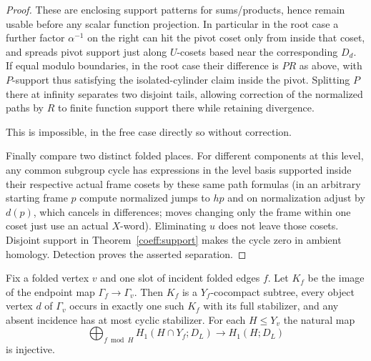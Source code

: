 \begin{proof}
These are enclosing support patterns for sums/products, hence remain usable before any scalar function projection. In particular in the root case a further factor \(\alpha^{-1}\) on the right can hit the pivot coset only from inside that coset, and spreads pivot support just along \(U\)-cosets based near the corresponding \(D_d\). If equal modulo boundaries, in the root case their difference is \(P R\) as above, with \(P\)-support thus satisfying the isolated-cylinder claim inside the pivot. Splitting \(P\) there at infinity separates two disjoint tails, allowing correction of the normalized paths by \(R\) to finite function support there while retaining divergence.

This is impossible, in the free case directly so without correction.

Finally compare two distinct folded places.
For different components at this level, any common subgroup cycle has expressions in the level basis supported inside their respective actual frame cosets by these same path formulas (in an arbitrary starting frame \(p\) compute normalized jumps to \(h p\) and on normalization adjust by \(d(p)\), which cancels in differences; moves changing only the frame within one coset just use an actual \(X\)-word). Eliminating \(u\) does not leave those cosets. Disjoint support in Theorem~\ref{coeff:support} makes the cycle zero in ambient homology. Detection proves the asserted separation.
\end{proof}

\begin{proposition}\label{close:folded-slot}
Fix a folded vertex $v$ and one slot of incident folded edges $f$.
Let $K_f$ be the image of the endpoint map
$\Gamma_f\to\Gamma_v$. Then $K_f$ is a $Y_f$-cocompact subtree, every
object vertex $d$ of $\Gamma_v$ occurs in exactly one such $K_f$ with
its full stabilizer, and any absent incidence has at most cyclic
stabilizer. For each $H\le Y_v$ the natural map
\begin{equation}\label{close:slot-injection}
 \bigoplus_{f\bmod H}H_1(H\cap Y_f;D_L)
             \longrightarrow H_1(H;D_L)
\end{equation}
is injective.
\end{proposition}

